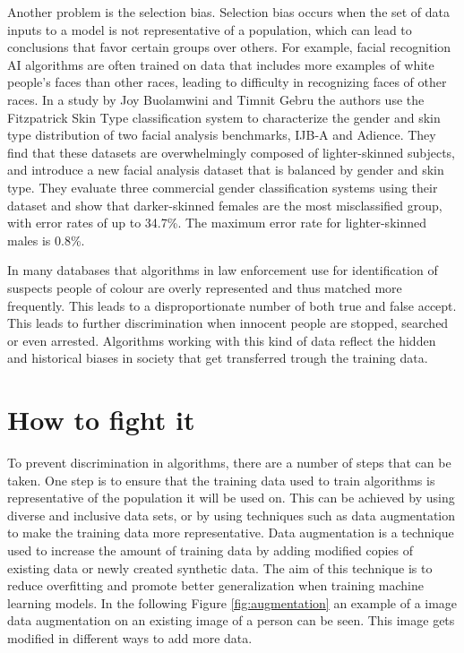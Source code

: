 \documentclass[
	12pt,
    a4paper,
    egregdoesnotlikesansseriftitles, %
    toc=chapterentrywithdots,
    oneside, openany,
    titlepage,
    parskip=half,
    headings=normal,  %
    listof=totoc,
    bibliography=totocnumbered,
    index=totoc,
    captions=tableheading,  %
    listof=flat,
    numbers=noenddot, %
    final]
    {scrbook}
\begin{document}
Another problem is the selection bias.
Selection bias occurs when the set of data inputs to a model is not representative of a population, which can lead to conclusions that favor certain groups over others. \cite[p. 8]{usa}
For example, facial recognition AI algorithms are often trained on data that includes more examples of white people's faces than other races, leading to difficulty in recognizing faces of other races.
In a study by Joy Buolamwini and Timnit Gebru the authors use the Fitzpatrick Skin Type classification system to characterize the gender and skin type distribution of two facial analysis benchmarks, IJB-A and Adience. 
They find that these datasets are overwhelmingly composed of lighter-skinned subjects, and introduce a new facial analysis dataset that is balanced by gender and skin type. 
They evaluate three commercial gender classification systems using their dataset and show that darker-skinned females are the most misclassified group, with error rates of up to 34.7\%. 
The maximum error rate for lighter-skinned males is 0.8\%. 
\cite[p. 1]{buolamwini_gender_2018}

In many databases that algorithms in law enforcement use for identification of suspects people of colour are overly represented and thus matched more frequently. 
This leads to a disproportionate number of both true and false accept. \cite[p. 323-324]{bacchini_race_2019}
This leads to further discrimination when innocent people are stopped, searched or even arrested.
Algorithms working with this kind of data reflect the hidden and historical biases in society that get transferred trough the training data. \cite[p. 8]{usa}



\chapter{How to fight it}
To prevent discrimination in algorithms, there are a number of steps that can be taken. 
One step is to ensure that the training data used to train algorithms is representative of the population it will be used on. 
This can be achieved by using diverse and inclusive data sets, or by using techniques such as data augmentation to make the training data more representative.
Data augmentation is a technique used to increase the amount of training data by adding modified copies of existing data or newly created synthetic data.
The aim of this technique is to reduce overfitting and promote better generalization when training machine learning models. \cite[p. 2]{nanni2022feature}
In the following Figure \ref{fig:augmentation} an example of a image data augmentation on an existing image of a person can be seen. 
This image gets modified in different ways to add more data.
\end{document}
